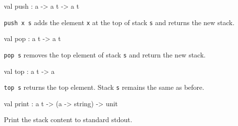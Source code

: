 \documentclass[11pt]{article}
\begin{document}
\label{val:Liststack.push}\begin{ocamldoccode}
val push : {\textquotesingle}a -> {\textquotesingle}a t -> {\textquotesingle}a t
\end{ocamldoccode}
\begin{ocamldocdescription}
{\tt{push x s}} adds the element {\tt{x}} at the top of stack {\tt{s}} and returns the new stack.


\end{ocamldocdescription}




\label{val:Liststack.pop}\begin{ocamldoccode}
val pop : {\textquotesingle}a t -> {\textquotesingle}a t
\end{ocamldoccode}
\begin{ocamldocdescription}
{\tt{pop s}} removes the top element of stack {\tt{s}} and return the new stack.


\end{ocamldocdescription}




\label{val:Liststack.top}\begin{ocamldoccode}
val top : {\textquotesingle}a t -> {\textquotesingle}a
\end{ocamldoccode}
\begin{ocamldocdescription}
{\tt{top s}} returns the top element. Stack {\tt{s}} remains the same as before.


\end{ocamldocdescription}




\label{val:Liststack.print}\begin{ocamldoccode}
val print : {\textquotesingle}a t -> ({\textquotesingle}a -> string) -> unit
\end{ocamldoccode}
\begin{ocamldocdescription}
Print the stack content to standard stdout.


\end{ocamldocdescription}
\end{document}
